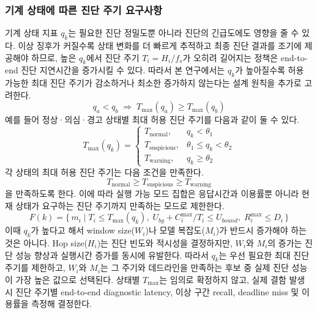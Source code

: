 \documentclass[10pt]{article}
\begin{document}
\subsubsection*{기계 상태에 따른 진단 주기 요구사항}
기계 상태 지표 $q_k$는 필요한 진단 정밀도뿐 아니라 진단의 긴급도에도 영향을 줄 수 있다. 이상 징후가 커질수록 상태 변화를 더 빠르게 추적하고 최종 진단 결과를 조기에 제공해야 하므로, 높은 $q_k$에서 진단 주기 $T_i = H_i/f_s$가 오히려 길어지는 정책은 end-to-end 진단 지연시간을 증가시킬 수 있다. 따라서 본 연구에서는 $q_k$가 높아질수록 허용 가능한 최대 진단 주기가 감소하거나 최소한 증가하지 않는다는 설계 원칙을 추가로 고려한다.
\begin{equation*}
q_a < q_b \;\Rightarrow\; T_{\max}(q_a) \ge T_{\max}(q_b)
\end{equation*}
예를 들어 정상·의심·경고 상태별 최대 허용 진단 주기를 다음과 같이 둘 수 있다.
\begin{equation*}
T_{\max}(q_k)=
\begin{cases}
T_{\mathrm{normal}}, & q_k < \theta_1\\
T_{\mathrm{suspicious}}, & \theta_1 \le q_k < \theta_2\\
T_{\mathrm{warning}}, & q_k \ge \theta_2
\end{cases}
\end{equation*}
각 상태의 최대 허용 진단 주기는 다음 조건을 만족한다.
\begin{equation*}
T_{\mathrm{normal}} \ge T_{\mathrm{suspicious}} \ge T_{\mathrm{warning}}
\end{equation*}
을 만족하도록 한다. 이에 따라 실행 가능 모드 집합은 응답시간과 이용률뿐 아니라 현재 상태가 요구하는 진단 주기까지 만족하는 모드로 제한한다.
\begin{equation*}
F(k)=\Big\{\, m_i \;\Big|\; T_i \le T_{\max}(q_k),\; U_{bg}+C_i^{\max}/T_i \le U_{bound},\; R_i^{\max} \le D_i \,\Big\}
\end{equation*}
이때 $q_k$가 높다고 해서 window size($W_i$)나 모델 복잡도($M_i$)가 반드시 증가해야 하는 것은 아니다. Hop size($H_i$)는 진단 빈도와 적시성을 결정하지만, $W_i$와 $M_i$의 증가는 진단 성능 향상과 실행시간 증가를 동시에 유발한다. 따라서 $q_k$는 우선 필요한 최대 진단 주기를 제한하고, $W_i$와 $M_i$는 그 주기와 데드라인을 만족하는 후보 중 실제 진단 성능이 가장 높은 값으로 선택된다. 상태별 $T_{\max}$는 임의로 확정하지 않고, 실제 결함 발생 시 진단 주기별 end-to-end diagnostic latency, 이상 구간 recall, deadline miss 및 이용률을 측정해 결정한다.
\end{document}
